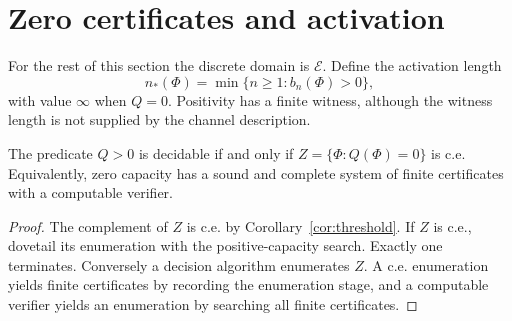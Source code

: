 \section{Zero certificates and activation}\label{sec:positive}
For the rest of this section the discrete domain is $\mathcal E$.
Define the activation length
\[
 n_*(\Phi)=\min\{n\geq1:b_n(\Phi)>0\},
\]
with value $\infty$ when $Q=0$. Positivity has a finite witness, although
the witness length is not supplied by the channel description.

\begin{proposition}\label{prop:zero}
The predicate $Q>0$ is decidable if and only if
$Z=\{\Phi:Q(\Phi)=0\}$ is c.e. Equivalently, zero capacity has a sound
and complete system of finite certificates with a computable verifier.
\end{proposition}
\begin{proof}
The complement of $Z$ is c.e. by Corollary~\ref{cor:threshold}.
If $Z$ is c.e., dovetail its enumeration with the positive-capacity
search. Exactly one terminates. Conversely a decision algorithm enumerates
$Z$. A c.e. enumeration yields finite certificates by recording the
enumeration stage, and a computable verifier yields an enumeration by
searching all finite certificates.
\end{proof}

